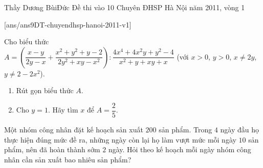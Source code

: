 \begin{name}
{Thầy Dương BùiĐức}
{Đề thi vào 10 Chuyên ĐHSP Hà Nội năm 2011, vòng 1}
\end{name}
\setcounter{ex}{0}
[ans/ans9DT-chuyendhsp-hanoi-2011-v1]
\begin{ex}%
Cho biểu thức\\
$A=\left(\dfrac{x-y}{2y-x}+\dfrac{x^{2}+y^{2}+y-2}{2y^{2}+xy-x^{2}}\right):\dfrac{4x^{4}+4x^{2}y+y^{2}-4}{x^{2}+y+xy+x}$ (với $x>0$, $y>0$, $x\neq 2y$, $y\neq 2-2x^{2}$).
\begin{enumerate}
\item Rút gọn biểu thức $A$.
\item Cho $y=1$. Hãy tìm $x$ để $A=\dfrac{2}{5}$.
\end{enumerate}
\end{ex}
\begin{ex}%
Một nhóm công nhân đặt kế hoạch sản xuất $200$ sản phẩm. Trong $4$ ngày đầu họ thực hiện đúng mức đề ra, những ngày còn lại họ làm vượt mức mỗi ngày $10$ sản phẩm, nên đã hoàn thành sớm $2$ ngày. Hỏi theo kế hoạch mỗi ngày nhóm công nhân cần sản xuất bao nhiêu sản phẩm?
\end{ex}
